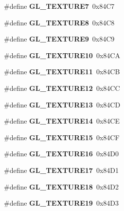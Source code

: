\begin{DoxyCompactItemize}
\item 
\#define {\bfseries G\+L\+\_\+\+T\+E\+X\+T\+U\+R\+E7}~0x84\+C7\label{_s_d_l__opengl_8h_a0f11172d6d2daa661bdb02545dff3644}

\item 
\#define {\bfseries G\+L\+\_\+\+T\+E\+X\+T\+U\+R\+E8}~0x84\+C8\label{_s_d_l__opengl_8h_a77bab3d67794d30842400a30868f03ae}

\item 
\#define {\bfseries G\+L\+\_\+\+T\+E\+X\+T\+U\+R\+E9}~0x84\+C9\label{_s_d_l__opengl_8h_a0a199c41bfc291046eaaa1546b8418f7}

\item 
\#define {\bfseries G\+L\+\_\+\+T\+E\+X\+T\+U\+R\+E10}~0x84\+C\+A\label{_s_d_l__opengl_8h_a10ac92e56a389e6d61fa67fce9647343}

\item 
\#define {\bfseries G\+L\+\_\+\+T\+E\+X\+T\+U\+R\+E11}~0x84\+C\+B\label{_s_d_l__opengl_8h_ac2a90866d1cde7e6180739930c102f6e}

\item 
\#define {\bfseries G\+L\+\_\+\+T\+E\+X\+T\+U\+R\+E12}~0x84\+C\+C\label{_s_d_l__opengl_8h_a451e0157013321b6c4f00e47578f8d44}

\item 
\#define {\bfseries G\+L\+\_\+\+T\+E\+X\+T\+U\+R\+E13}~0x84\+C\+D\label{_s_d_l__opengl_8h_ad2bca89bea17bfd0fe0f3f64aab40549}

\item 
\#define {\bfseries G\+L\+\_\+\+T\+E\+X\+T\+U\+R\+E14}~0x84\+C\+E\label{_s_d_l__opengl_8h_a6c992a9191154ef9a7d224157b46f1ec}

\item 
\#define {\bfseries G\+L\+\_\+\+T\+E\+X\+T\+U\+R\+E15}~0x84\+C\+F\label{_s_d_l__opengl_8h_a6a3147750845b658205b5efe6a279a45}

\item 
\#define {\bfseries G\+L\+\_\+\+T\+E\+X\+T\+U\+R\+E16}~0x84\+D0\label{_s_d_l__opengl_8h_a552aba54f1f9531860c2b332fd0869b4}

\item 
\#define {\bfseries G\+L\+\_\+\+T\+E\+X\+T\+U\+R\+E17}~0x84\+D1\label{_s_d_l__opengl_8h_accdb7c47dae700218b31fb2b129ee0f4}

\item 
\#define {\bfseries G\+L\+\_\+\+T\+E\+X\+T\+U\+R\+E18}~0x84\+D2\label{_s_d_l__opengl_8h_a08cd70d6ead4e0219daa481299f8f10e}

\item 
\#define {\bfseries G\+L\+\_\+\+T\+E\+X\+T\+U\+R\+E19}~0x84\+D3\label{_s_d_l__opengl_8h_acdbdc0b3c774163814b3923049d7d532}


\end{DoxyCompactItemize}
